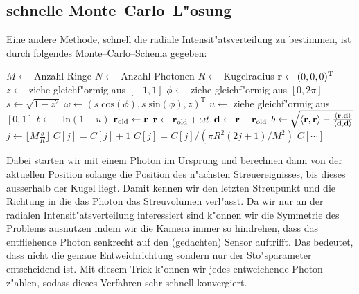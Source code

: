 	\subsection{schnelle Monte--Carlo--L"osung}
	Eine andere Methode, schnell die radiale Intensit"atsverteilung zu bestimmen, ist durch folgendes Monte--Carlo--Schema gegeben:
	\begin{algorithmic}
		\STATE $M\leftarrow$ Anzahl Ringe
		\STATE $N\leftarrow$ Anzahl Photonen
		\STATE $R\leftarrow$ Kugelradius
			\STATE $\mathbf{r}\leftarrow (0,0,0)^\text{T}$
			\REPEAT
				\STATE{}
				\STATE $z\leftarrow$ ziehe gleichf"ormig aus $[-1,1]$
				\STATE $\phi\leftarrow$ ziehe gleichf"ormig aus $[0,2\pi]$
				\STATE $s\leftarrow\sqrt{1-z^2}$
				\STATE $\omega\leftarrow (s\;\text{cos}(\phi),s\;\text{sin}(\phi),z)^\text{T}$
				\STATE{}
				\STATE $u\leftarrow$ ziehe gleichf"ormig aus $[0,1]$
				\STATE $t\leftarrow -\text{ln}(1-u)$
				\STATE $\mathbf{r}_\text{old}\leftarrow\mathbf{r}$
				\STATE $\mathbf{r}\leftarrow\mathbf{r}_\text{old}+\omega t$
			\STATE{}
			\STATE $\mathbf{d}\leftarrow\mathbf{r}-\mathbf{r}_\text{old}$
			\STATE $b\leftarrow\sqrt{\langle\mathbf{r},\mathbf{r}\rangle-\frac{\langle\mathbf{r},\mathbf{d}\rangle}{\langle\mathbf{d},\mathbf{d}\rangle}}$
			\STATE $j\leftarrow\lfloor M\frac{b}{R}\rfloor$
			\STATE $C[j]=C[j]+1$
		\ENDFOR
			\STATE $C[j]=C[j]/(\pi R^2(2j+1)/M^2)$
		\ENDFOR
		\RETURN $C[\cdots]$
	\end{algorithmic}
	Dabei starten wir mit einem Photon im Ursprung und berechnen dann von der aktuellen Position solange die Position des n"achsten Streuereignisses, bis dieses ausserhalb der Kugel liegt. Damit kennen wir den letzten Streupunkt und die Richtung in die das Photon das Streuvolumen verl"asst. Da wir nur an der radialen Intensit"atsverteilung interessiert sind k"onnen wir die Symmetrie des Problems ausnutzen indem wir die Kamera immer so hindrehen, dass das entfliehende Photon senkrecht auf den (gedachten) Sensor auftrifft. Das bedeutet, dass nicht die genaue Entweichrichtung sondern nur der Sto"sparameter entscheidend ist. Mit diesem Trick k"onnen wir jedes entweichende Photon z"ahlen, sodass dieses Verfahren sehr schnell konvergiert.
	
	
